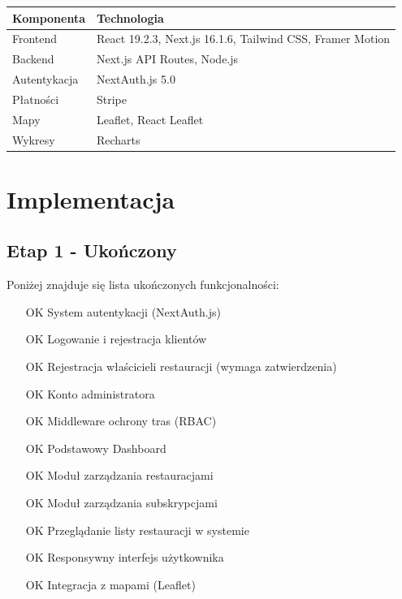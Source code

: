 \documentclass[12pt,a4paper,utf-8]{article}
\begin{document}
\begin{tabularx}{\textwidth}{|l|X|}
    \hline
    \textbf{Komponenta} & \textbf{Technologia} \\
    \hline
    Frontend & React 19.2.3, Next.js 16.1.6, Tailwind CSS, Framer Motion \\
    \hline
    Backend & Next.js API Routes, Node.js \\
    \hline
    Autentykacja & NextAuth.js 5.0 \\
    \hline
    Płatności & Stripe \\
    \hline
    Mapy & Leaflet, React Leaflet \\
    \hline
    Wykresy & Recharts \\
    \hline
\end{tabularx}

\newpage

\section{Implementacja}

\subsection{Etap 1 - Ukończony}

Poniżej znajduje się lista ukończonych funkcjonalności:

\begin{enumerate}
    \item [OK] System autentykacji (NextAuth.js)
    \item [OK] Logowanie i rejestracja klientów
    \item [OK] Rejestracja właścicieli restauracji (wymaga zatwierdzenia)
    \item [OK] Konto administratora
    \item [OK] Middleware ochrony tras (RBAC)
    \item [OK] Podstawowy Dashboard
    \item [OK] Moduł zarządzania restauracjami
    \item [OK] Moduł zarządzania subskrypcjami
    \item [OK] Przeglądanie listy restauracji w systemie
    \item [OK] Responsywny interfejs użytkownika
    \item [OK] Integracja z mapami (Leaflet)


\end{enumerate}
\end{document}
